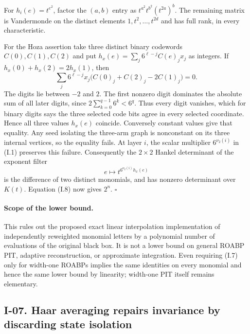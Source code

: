 \documentclass[11pt,a4paper]{article}
\theoremstyle{definition}\newtheorem{definition}{Definition}
\begin{document}
For $h_i(e)=t^{e^2}$, factor the $(a,b)$ entry as
$t^{a^2}t^{b^2}(t^{2a})^b$.  The remaining matrix is Vandermonde
on the distinct elements $1,t^2,\ldots,t^{2d}$ and has full rank,
in every characteristic.

For the Hoza assertion take three distinct binary codewords
$C(0),C(1),C(2)$ and put
$h_x(e)=\sum_j6^{\ell-j}C(e)_j x_j$ as integers.
If $h_x(0)+h_x(2)=2h_x(1)$, then
\[
 \sum_j6^{\ell-j}x_j\bigl(C(0)_j+C(2)_j-2C(1)_j\bigr)=0.
\]
The digits lie between $-2$ and $2$.  The first nonzero digit
dominates the absolute sum of all later digits, since
$2\sum_{k=0}^{q-1}6^k<6^q$.  Thus every digit vanishes, which for
binary digits says the three selected code bits agree in every
selected coordinate.  Hence all three values $h_x(e)$ coincide.
Conversely constant values give that equality.  Any seed isolating
the three-arm graph is nonconstant on its three internal vertices,
so the equality fails.  At layer $i$, the scalar multiplier
$6^{\nu_2(i)}$ in (I.1) preserves this failure.  Consequently the
$2\times2$ Hankel determinant of the exponent filter
\[
 e\longmapsto t^{6^{\nu_2(i)}h_x(e)}
\]
is the difference of two distinct monomials, and has nonzero
determinant over $K(t)$.  Equation (I.8) now gives $2^n$.
\hfill$\square$

\paragraph{Scope of the lower bound.}
This rules out the proposed exact linear interpolation implementation
of independently reweighted monomial letters by a polynomial number
of evaluations of the original black box.  It is not a lower bound
on general ROABP PIT, adaptive reconstruction, or approximate
integration.  Even requiring (I.7) only for width-one ROABPs implies
the same identities on every monomial and hence the same lower
bound by linearity; width-one PIT itself remains elementary.

\subsection{I-07. Haar averaging repairs invariance by discarding state isolation}
\label{I-07}
\end{document}
